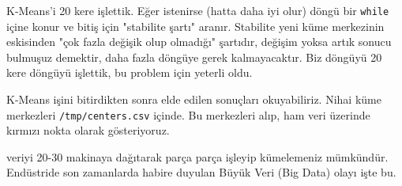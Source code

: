 \documentclass[12pt,fleqn]{article}\usepackage{../../common}
\begin{document}
K-Means'i 20 kere işlettik. Eğer istenirse (hatta daha iyi olur) döngü bir
\verb!while! içine konur ve bitiş için "stabilite şartı"
aranır. Stabilite yeni küme merkezinin eskisinden "çok fazla değişik olup
olmadığı" şartıdır, değişim yoksa artık sonucu bulmuşuz demektir, daha
fazla döngüye gerek kalmayacaktır. Biz döngüyü 20 kere döngüyü işlettik,
bu problem için yeterli oldu.

K-Means işini bitirdikten sonra elde edilen sonuçları okuyabiliriz. Nihai
küme merkezleri \verb!/tmp/centers.csv! içinde. Bu merkezleri alıp,
ham veri üzerinde kırmızı nokta olarak gösteriyoruz.

veriyi 20-30 makinaya dağıtarak parça parça işleyip kümelemeniz
mümkündür. Endüstride son zamanlarda habire duyulan Büyük Veri (Big Data)
olayı işte bu.
\end{document}
